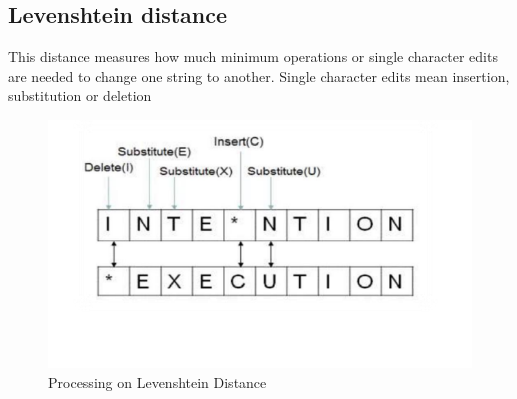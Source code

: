 \documentclass[12pt,letterpaper]{article}
\begin{document}
\begin{flushleft}
\subsection{Levenshtein distance}
This distance measures how much minimum operations or single character edits are needed to change 
one string to another. Single character edits mean insertion, substitution or deletion
\begin{figure}[h]
    \centering
    \includegraphics[scale=0.8]{lavestrain.png}
    \caption{ Processing on Levenshtein Distance}
    \label{fig:myfigure}
\end{figure}

\end{flushleft}
\end{document}
